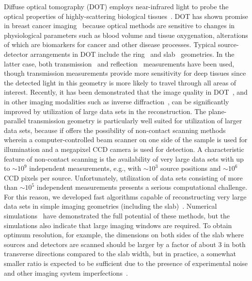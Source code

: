 Diffuse optical tomography (DOT) employs near-infrared light to probe the optical properties of highly-scattering biological tissues~\cite{arridge_99_1,boas_01_1,arridge_09_1}. DOT has shown
promise in breast cancer imaging~\cite{colak_99_1,hawrysz_00_1,mcbride_01_1,culver_03_1,intes_03_1,li_03_1,choe_05_1,yates_05_1,corlu_07_1,cerussi_07_1,choe_09_1,durduran_10_1} because optical methods are sensitive to changes in physiological parameters such as blood volume and tissue oxygenation, alterations of which are biomarkers for cancer and other disease processes.  Typical source-detector arrangements in DOT include the ring~\cite{pogue_95_1} and slab~\cite{grosenick_05_1,pifferi_03_1,choe_09_1} geometries. In the latter case, both transmission~\cite{choe_09_1} and reflection~\cite{ge_08_1} measurements have been used, though transmission measurements provide more sensitivity for deep tissues since the detected light in this geometry is more likely to travel through all areas of interest. Recently, it has been demonstrated that the image quality in DOT~\cite{wang_05_1,konecky_08_1,bonfert-taylor_12_1}, and in other imaging modalities such as inverse diffraction~\cite{chaillat_12_1}, can be significantly improved by utilization of large data sets in the reconstruction. The plane-parallel transmission geometry is particularly well suited for utilization of larger data sets, because if offers the possibility of non-contact scanning methods~\cite{schulz_03_1,ripoll_03_2,ripoll_04_1,turner_05_1,wang_05_1} wherein a computer-controlled beam scanner on one side of the sample is used for illumination and a megapixel CCD camera is used for detection.  A characteristic feature of non-contact scanning is the availability of very large data sets with up to $\sim 10^9$ independent measurements, e.g., with $\sim 10^3$ source positions and $\sim 10^6$ CCD pixels per source. Unfortunately, utilization of data sets consisting of more than $\sim 10^5$ independent measurements presents a serious computational challenge. For this reason, we developed fast algorithms capable of reconstructing very large data sets in simple imaging geometries (including the slab)~\cite{markel_01_3,markel_02_2,markel_03_1,markel_03_2,markel_04_4}. Numerical simulations~\cite{markel_02_2} have demonstrated the full potential of these methods, but the simulations also indicate that large imaging windows are required. To obtain optimum resolution, for example, the dimensions on both sides of the slab where sources and detectors are scanned should be larger by a factor of about $3$ in both transverse directions compared to the slab width, but in practice, a somewhat smaller ratio is expected to be sufficient due to the presence of experimental
noise and other imaging system imperfections~\cite{wang_05_1,konecky_08_1}.

